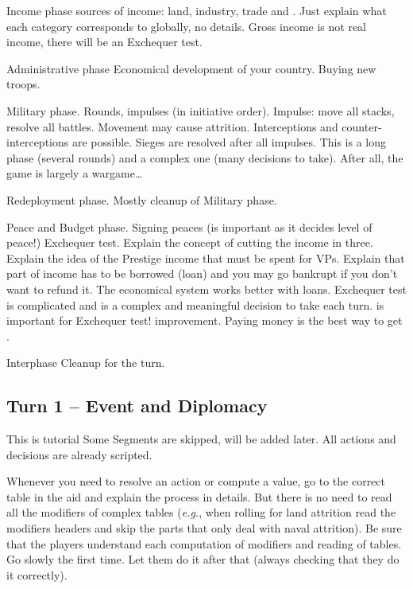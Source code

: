 \aparag Income phase
 sources of income: land, industry, trade and \ROTW.
\bparag Just explain what each category corresponds to globally, no details.
\bparag Gross income is not real income, there will be an Exchequer test.

\aparag Administrative phase
\bparag Economical development of your country.
\bparag Buying new troops.

\aparag Military phase.
\bparag Rounds, impulses (in initiative order).
\bparag Impulse: move all stacks, resolve all battles.
\bparag Movement may cause attrition.
\bparag Interceptions and counter-interceptions are possible.
\bparag Sieges are resolved after all impulses.
\bparag This is a long phase (several rounds) and a complex one (many
decisions to take). After all, the game is largely a wargame\ldots

\aparag Redeployment phase.
\bparag Mostly cleanup of Military phase.

\aparag Peace and Budget phase.
\bparag Signing peaces (\STAB is important as it decides level of peace!)
\bparag Exchequer test.
\bparag Explain the concept of cutting the income in three.
\bparag Explain the idea of the Prestige income that must be spent for VPs.
\bparag Explain that part of income has to be borrowed (loan) and you may go
bankrupt if you don't want to refund it.
\bparag The economical system works better with loans.
\bparag Exchequer test is complicated and is a complex and meaningful decision
to take each turn.
\bparag \STAB is important for Exchequer test!
\bparag \STAB improvement. Paying money is the best way to get \STAB.

\aparag Interphase
\bparag Cleanup for the turn.

\subsection{Turn 1 -- Event and Diplomacy}
\aparag This is tutorial
\bparag Some Segments are skipped, will be added later.
\bparag All actions and decisions are already scripted.

\aparag Whenever you need to resolve an action or compute a value, go to the
correct table in the aid and explain the process in details.
\bparag But there is no need to read all the modifiers of complex tables
(\emph{e.g.}, when rolling for land attrition read the modifiers headers and
skip the parts that only deal with naval attrition).
\bparag Be sure that the players understand each computation of modifiers and
reading of tables. Go slowly the first time. Let them do it after that (always
checking that they do it correctly).

